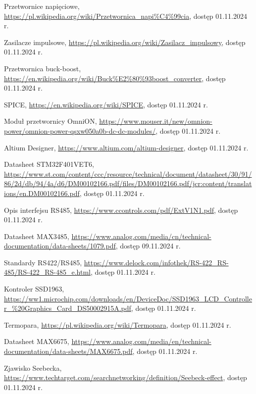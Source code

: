 \begin{thebibliography}{}

 Przetwornice napięciowe, \url{https://pl.wikipedia.org/wiki/Przetwornica_napi%C4%99cia}, dostęp 01.11.2024 r.

 Zasilacze impulsowe, \url{https://pl.wikipedia.org/wiki/Zasilacz_impulsowy}, dostęp 01.11.2024 r.

 Przetwornica buck-boost, \url{https://en.wikipedia.org/wiki/Buck%E2%80%93boost_converter}, dostęp 01.11.2024 r.

 SPICE, \url{https://en.wikipedia.org/wiki/SPICE}, dostęp 01.11.2024 r.

 Moduł przetwornicy OmniON, \url{https://www.mouser.it/new/omnion-power/omnion-power-qsxw050a0b-dc-dc-modules/}, dostęp 01.11.2024 r.

 Altium Designer, \url{https://www.altium.com/altium-designer}, dostęp 01.11.2024 r.

 Datasheet STM32F401VET6, \url{https://www.st.com/content/ccc/resource/technical/document/datasheet/30/91/86/2d/db/94/4a/d6/DM00102166.pdf/files/DM00102166.pdf/jcr:content/translations/en.DM00102166.pdf}, dostęp 01.11.2024 r.

 Opis interfejsu RS485, \url{https://www.ccontrols.com/pdf/ExtV1N1.pdf}, dostęp 01.11.2024 r.

 Datasheet MAX3485, \url{https://www.analog.com/media/cn/technical-documentation/data-sheets/1079.pdf}, dostęp 09.11.2024 r.

 Standardy RS422/RS485, \url{https://www.delock.com/infothek/RS-422_RS-485/RS-422_RS-485_e.html}, dostęp 01.11.2024 r.

 Kontroler SSD1963, \url{https://ww1.microchip.com/downloads/en/DeviceDoc/SSD1963_LCD_Controller_%20Graphics_Card_DS50002915A.pdf}, dostęp 01.11.2024 r.

 Termopara, \url{https://pl.wikipedia.org/wiki/Termopara}, dostęp 01.11.2024 r.

 Datasheet MAX6675, \url{https://www.analog.com/media/en/technical-documentation/data-sheets/MAX6675.pdf}, dostęp 01.11.2024 r.

 Zjawisko Seebecka, \url{https://www.techtarget.com/searchnetworking/definition/Seebeck-effect}, dostęp 01.11.2024 r.


\end{thebibliography}
